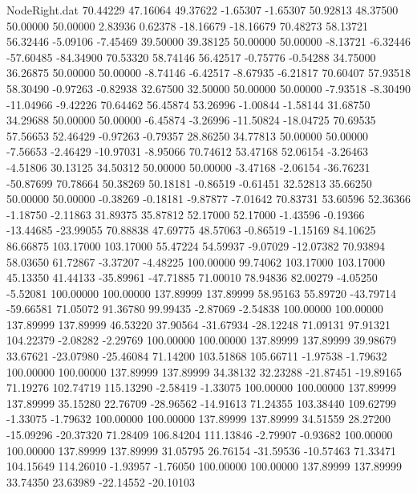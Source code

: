 \begin{filecontents}{NodeRight.dat}
  70.44229   47.16064   49.37622    -1.65307   -1.65307   50.92813   48.37500   50.00000   50.00000    2.83936    0.62378  -18.16679  -18.16679
  70.48273   58.13721   56.32446    -5.09106   -7.45469   39.50000   39.38125   50.00000   50.00000   -8.13721   -6.32446  -57.60485  -84.34900
  70.53320   58.74146   56.42517    -0.75776   -0.54288   34.75000   36.26875   50.00000   50.00000   -8.74146   -6.42517   -8.67935   -6.21817
  70.60407   57.93518   58.30490    -0.97263   -0.82938   32.67500   32.50000   50.00000   50.00000   -7.93518   -8.30490  -11.04966   -9.42226
  70.64462   56.45874   53.26996    -1.00844   -1.58144   31.68750   34.29688   50.00000   50.00000   -6.45874   -3.26996  -11.50824  -18.04725
  70.69535   57.56653   52.46429    -0.97263   -0.79357   28.86250   34.77813   50.00000   50.00000   -7.56653   -2.46429  -10.97031   -8.95066
  70.74612   53.47168   52.06154    -3.26463   -4.51806   30.13125   34.50312   50.00000   50.00000   -3.47168   -2.06154  -36.76231  -50.87699
  70.78664   50.38269   50.18181    -0.86519   -0.61451   32.52813   35.66250   50.00000   50.00000   -0.38269   -0.18181   -9.87877   -7.01642
  70.83731   53.60596   52.36366    -1.18750   -2.11863   31.89375   35.87812   52.17000   52.17000   -1.43596   -0.19366  -13.44685  -23.99055
  70.88838   47.69775   48.57063    -0.86519   -1.15169   84.10625   86.66875  103.17000  103.17000   55.47224   54.59937   -9.07029  -12.07382
  70.93894   58.03650   61.72867    -3.37207   -4.48225  100.00000   99.74062  103.17000  103.17000   45.13350   41.44133  -35.89961  -47.71885
  71.00010   78.94836   82.00279    -4.05250   -5.52081  100.00000  100.00000  137.89999  137.89999   58.95163   55.89720  -43.79714  -59.66581
  71.05072   91.36780   99.99435    -2.87069   -2.54838  100.00000  100.00000  137.89999  137.89999   46.53220   37.90564  -31.67934  -28.12248
  71.09131   97.91321  104.22379    -2.08282   -2.29769  100.00000  100.00000  137.89999  137.89999   39.98679   33.67621  -23.07980  -25.46084
  71.14200  103.51868  105.66711    -1.97538   -1.79632  100.00000  100.00000  137.89999  137.89999   34.38132   32.23288  -21.87451  -19.89165
  71.19276  102.74719  115.13290    -2.58419   -1.33075  100.00000  100.00000  137.89999  137.89999   35.15280   22.76709  -28.96562  -14.91613
  71.24355  103.38440  109.62799    -1.33075   -1.79632  100.00000  100.00000  137.89999  137.89999   34.51559   28.27200  -15.09296  -20.37320
  71.28409  106.84204  111.13846    -2.79907   -0.93682  100.00000  100.00000  137.89999  137.89999   31.05795   26.76154  -31.59536  -10.57463
  71.33471  104.15649  114.26010    -1.93957   -1.76050  100.00000  100.00000  137.89999  137.89999   33.74350   23.63989  -22.14552  -20.10103

\end{filecontents}
